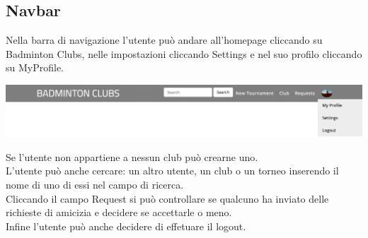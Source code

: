 \documentclass{article}
\begin{document}
\subsection{Navbar}
Nella barra di navigazione l'utente può andare all'homepage cliccando su Badminton Clubs, nelle impostazioni cliccando Settings e nel suo profilo cliccando su MyProfile.
\begin{center}
    \includegraphics[width=16cm]{UX/navbar}
\end{center}
Se l'utente non appartiene a nessun club può crearne uno.\\
L'utente può anche cercare: un altro utente, un club o un torneo inserendo il nome di uno di essi nel campo di ricerca.\\
Cliccando il campo Request si può controllare se qualcuno ha inviato delle richieste di amicizia e decidere se accettarle o meno.\\
Infine l'utente può anche decidere di effetuare il logout.
\end{document}
